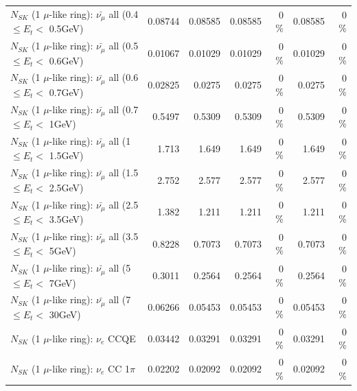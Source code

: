 \begin{table}
\begin{tabular}{| l | r | r | r  r | r  r |}
 $N_{SK}$ (1 $\mu$-like ring): $\bar{\nu_{\mu}}$ all (0.4 $\leq E_{t} <$ 0.5GeV) &         0.08744 &         0.08585 &         0.08585 &        0 \%  &         0.08585 &        0 \%  \\ 
 $N_{SK}$ (1 $\mu$-like ring): $\bar{\nu_{\mu}}$ all (0.5 $\leq E_{t} <$ 0.6GeV) &         0.01067 &         0.01029 &         0.01029 &        0 \%  &         0.01029 &        0 \%  \\ 
 $N_{SK}$ (1 $\mu$-like ring): $\bar{\nu_{\mu}}$ all (0.6 $\leq E_{t} <$ 0.7GeV) &         0.02825 &          0.0275 &          0.0275 &        0 \%  &          0.0275 &        0 \%  \\ 
   $N_{SK}$ (1 $\mu$-like ring): $\bar{\nu_{\mu}}$ all (0.7 $\leq E_{t} <$ 1GeV) &          0.5497 &          0.5309 &          0.5309 &        0 \%  &          0.5309 &        0 \%  \\ 
   $N_{SK}$ (1 $\mu$-like ring): $\bar{\nu_{\mu}}$ all (1 $\leq E_{t} <$ 1.5GeV) &           1.713 &           1.649 &           1.649 &        0 \%  &           1.649 &        0 \%  \\ 
 $N_{SK}$ (1 $\mu$-like ring): $\bar{\nu_{\mu}}$ all (1.5 $\leq E_{t} <$ 2.5GeV) &           2.752 &           2.577 &           2.577 &        0 \%  &           2.577 &        0 \%  \\ 
 $N_{SK}$ (1 $\mu$-like ring): $\bar{\nu_{\mu}}$ all (2.5 $\leq E_{t} <$ 3.5GeV) &           1.382 &           1.211 &           1.211 &        0 \%  &           1.211 &        0 \%  \\ 
   $N_{SK}$ (1 $\mu$-like ring): $\bar{\nu_{\mu}}$ all (3.5 $\leq E_{t} <$ 5GeV) &          0.8228 &          0.7073 &          0.7073 &        0 \%  &          0.7073 &        0 \%  \\ 
     $N_{SK}$ (1 $\mu$-like ring): $\bar{\nu_{\mu}}$ all (5 $\leq E_{t} <$ 7GeV) &          0.3011 &          0.2564 &          0.2564 &        0 \%  &          0.2564 &        0 \%  \\ 
    $N_{SK}$ (1 $\mu$-like ring): $\bar{\nu_{\mu}}$ all (7 $\leq E_{t} <$ 30GeV) &         0.06266 &         0.05453 &         0.05453 &        0 \%  &         0.05453 &        0 \%  \\ 
\hline
\hline
\hline
                                      $N_{SK}$ (1 $\mu$-like ring): $\nu_e$ CCQE &         0.03442 &         0.03291 &         0.03291 &        0 \%  &         0.03291 &        0 \%  \\ 
                                 $N_{SK}$ (1 $\mu$-like ring): $\nu_e$ CC 1$\pi$ &         0.02202 &         0.02092 &         0.02092 &        0 \%  &         0.02092 &        0 \%  \\ 

\end{tabular}
\end{table}
